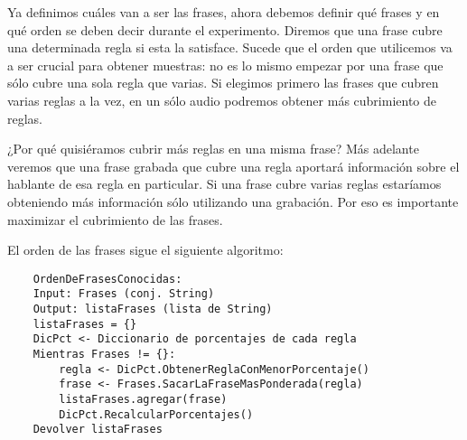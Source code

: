 Ya definimos cuáles van a ser las frases, ahora debemos definir qué frases y en qué orden se deben decir durante el experimento. Diremos que una frase cubre una determinada regla si esta la satisface. Sucede que el orden que utilicemos va a ser crucial para obtener muestras: no es lo mismo empezar por una frase que sólo cubre una sola regla que varias. Si elegimos primero las frases que cubren varias reglas a la vez, en un sólo audio podremos obtener más cubrimiento de reglas. 

¿Por qué quisiéramos cubrir más reglas en una misma frase? Más adelante veremos que una frase grabada que cubre una regla aportará información sobre el hablante de esa regla en particular. Si una frase cubre varias reglas estaríamos obteniendo más información sólo utilizando una grabación. Por eso es importante maximizar el cubrimiento de las frases.  

El orden de las frases sigue el siguiente algoritmo:

\begin{lstlisting}
    OrdenDeFrasesConocidas:
    Input: Frases (conj. String)
    Output: listaFrases (lista de String)
    listaFrases = {}
    DicPct <- Diccionario de porcentajes de cada regla
    Mientras Frases != {}:
    	regla <- DicPct.ObtenerReglaConMenorPorcentaje()
    	frase <- Frases.SacarLaFraseMasPonderada(regla)
    	listaFrases.agregar(frase)
    	DicPct.RecalcularPorcentajes()
    Devolver listaFrases
\end{lstlisting}

